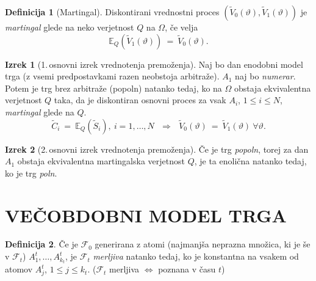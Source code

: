 \documentclass[11pt]{article}
\newcommand{\E}{\mathbb{E}}
\newcommand{\F}{\mathcal{F}}
\newcommand{\1}{\mathbbm{1}}
\theoremstyle{definition}
\newtheorem{definicija}{Definicija}[section]
\theoremstyle{definition}
\newtheorem{izrek}{Izrek}[section]
\begin{document}
\begin{definicija}[Martingal]

Diskontirani vrednostni proces $(\tilde{V}_0(\vartheta), \tilde{V}_1(\vartheta))$ je \textit{martingal} glede na neko verjetnost $Q$ na $\Omega$, če velja
$$\E_Q(\tilde{V}_1(\vartheta)) ~=~ \tilde{V}_0(\vartheta).$$

\end{definicija}
\vspace{0.5cm}

\begin{izrek}[1.\,osnovni izrek vrednotenja premoženja]

Naj bo dan enodobni model trga (z vsemi predpostavkami razen neobstoja arbitraže). $A_1$ naj bo \textit{numerar}. Potem je trg brez arbitraže (popoln) natanko tedaj, ko na $\Omega$ obstaja ekvivalentna verjetnost $Q$ taka, da je diskontiran osnovni proces za vsak $A_i$, $1 \leq i \leq N$, \textit{martingal} glede na $Q$.
$$\tilde{C}_i ~=~ \E_Q(\tilde{S}_i), ~i = 1,\ldots, N ~~~\Longrightarrow~~~ \tilde{V}_0(\vartheta) ~=~ \tilde{V}_1(\vartheta) ~\forall \vartheta.$$

\end{izrek}
\vspace{0.5cm}

\begin{izrek}[2.\,osnovni izrek vrednotenja premoženja]

Če je trg \textit{popoln}, torej za dan $A_1$ obstaja ekvivalentna martingalska verjetnost $Q$, je ta enolična natanko tedaj, ko je trg \textit{poln}.

\end{izrek}
\vspace{0.5cm}

\pagebreak


\section{VEČOBDOBNI MODEL TRGA}
\vspace{0.5cm}

\begin{definicija}

Če je $\F_0$ generirana z atomi (najmanjša neprazna množica, ki je še v $\F_t$) $A_1^t,\ldots, A_{k_t}^t$, je $\F_t$ \textit{merljiva} natanko tedaj, ko je konstantna na vsakem od atomov $A_j^t$, $1 \leq j \leq k_t$. ($\F_t$ merljiva $\iff$ poznana v času $t$)

\end{definicija}
\vspace{0.5cm}
\end{document}
